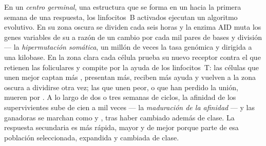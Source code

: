 \begin{definition}\label{def:b3:adaptive-immunity:germinal-centre}
En un \emph{centro germinal}, una estructura que se forma en un  hacia la primera semana de una respuesta, los linfocitos~B
activados ejecutan un algoritmo evolutivo. En su zona oscura se dividen
cada seis horas y la enzima AID muta los genes variables de su 
a razón de un cambio por cada mil pares de bases y división --- la
\emph{hipermutación somática}, un millón de veces la tasa genómica y
dirigida a una kilobase. En la zona clara cada célula prueba su nuevo
receptor contra el  que retienen las 
foliculares y compite por la ayuda de los linfocitos~T: las células que
unen mejor captan más , presentan más, reciben más ayuda y
vuelven a la zona oscura a dividirse otra vez; las que unen peor, o que
han perdido la unión, mueren por . A lo largo de dos o tres
semanas de ciclos, la afinidad de los  supervivientes sube de
cien a mil veces --- la \emph{maduración de la afinidad} --- y las
ganadoras se marchan como  y , tras
haber cambiado además de clase. La respuesta secundaria es más rápida,
mayor y de mejor  porque parte de esa población seleccionada,
expandida y cambiada de clase.
\end{definition}

